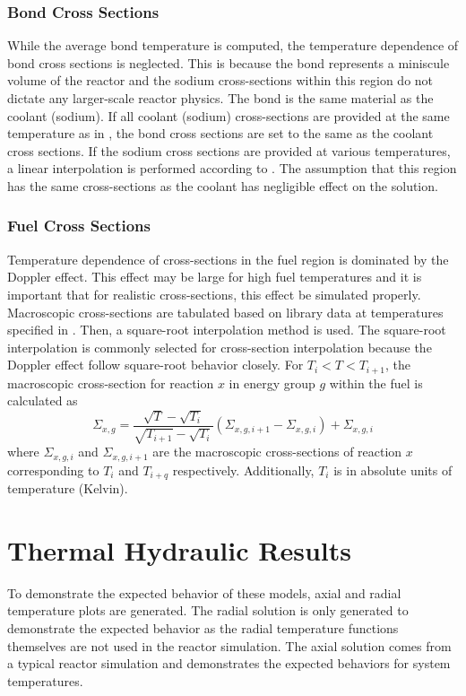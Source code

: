     \subsubsection{Bond Cross Sections}
      While the average bond temperature is computed, the temperature dependence
      of bond cross sections is neglected. This is because the bond represents a
      miniscule volume of the reactor and the sodium cross-sections within this
      region do not dictate any larger-scale reactor physics. The bond is the 
      same material as the coolant (sodium). If all coolant (sodium) 
      cross-sections are provided at the same temperature as in 
      , the bond cross sections are set to the same as the 
      coolant cross sections. If the sodium cross sections are provided at
      various temperatures, a linear interpolation is performed according to
      . The assumption that this region has the
      same cross-sections as the coolant has negligible effect on the solution.

    \subsubsection{Fuel Cross Sections}
      Temperature dependence of cross-sections in the fuel region is dominated
      by the Doppler effect. This effect may be large for high fuel temperatures
      and it is important that for realistic cross-sections, this effect be
      simulated properly. Macroscopic cross-sections are tabulated based on
      library data at temperatures specified in . Then, a
      square-root interpolation method is used. The square-root interpolation is
      commonly selected for cross-section interpolation because the Doppler
      effect follow square-root behavior closely. For $T_i < T < T_{i+1}$, the
      macroscopic cross-section for reaction $x$ in energy group $g$ within the
      fuel is calculated as
      \begin{equation}
        \Sigma_{x,g} = 
          \frac{\sqrt{T} - \sqrt{T_{i}}}{\sqrt{T_{i+1}}-\sqrt{T_{i}}}
          (\Sigma_{x,g,i+1} - \Sigma_{x,g,i})  + \Sigma_{x,g,i}
      \end{equation}
      where $\Sigma_{x,g,i}$ and $\Sigma_{x,g,i+1}$ are the macroscopic
      cross-sections of reaction $x$ corresponding to $T_i$ and $T_{i+q}$
      respectively. Additionally, $T_i$ is in absolute units of temperature
      (Kelvin).
      
\section{Thermal Hydraulic Results}
  To demonstrate the expected behavior of these models, axial and radial
  temperature plots are generated. The radial solution is only generated to
  demonstrate the expected behavior as the radial temperature functions
  themselves are not used in the reactor simulation. The axial solution comes
  from a typical reactor simulation and demonstrates the expected behaviors for
  system temperatures.

